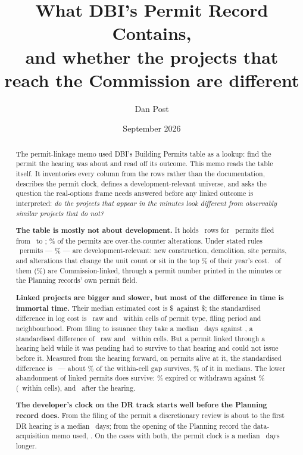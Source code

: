 \documentclass[11pt]{article}
\title{What DBI's Permit Record Contains,\\
\large and whether the projects that reach the Commission are different}
\author{Dan Post}
\date{September 2026}
\begin{document}
\maketitle

\begin{abstract}
\noindent
The permit-linkage memo used DBI's Building Permits table as a lookup: find the permit the
hearing was about and read off its outcome. This memo reads the table itself. It inventories
every column from the rows rather than the documentation, describes the permit clock, defines
a development-relevant universe, and asks the question the real-options frame needs answered
before any linked outcome is interpreted: \emph{do the projects that appear in the minutes
look different from observably similar projects that do not?}

\medskip\noindent
\textbf{The table is mostly not about development.} It holds \pcRows\ rows for \pcPermits\
permits filed from \pcFiledFirst\ to \pcFiledLast; \pcOTCShare\% of the permits are
over-the-counter alterations. Under stated rules \pcUniverse\ permits --- \pcUniverseShare\%
--- are development-relevant: new construction, demolition, site permits, and alterations that
change the unit count or sit in the top \pcCostQ\% of their year's cost. \pcLinked\ of them
(\pcLinkedShare\%) are Commission-linked, through a permit number printed in the minutes or the
Planning records' own permit field.

\medskip\noindent
\textbf{Linked projects are bigger and slower, but most of the difference in time is
immortal time.} Their median estimated cost is \$\pcLinkedCostMed\ against
\$\pcUnlinkedCostMed; the standardised difference in log cost is \pcSdLogCostRaw\ raw and
\pcSdLogCostCell\ within cells of permit type, filing period and neighbourhood. From filing to
issuance they take a median \pcLinkedDays\ days against \pcUnlinkedDays, a standardised
difference of \pcSdDaysRaw\ raw and \pcSdDaysCell\ within cells. But a permit linked through a
hearing held while it was pending had to survive to that hearing and could not issue before
it. Measured from the hearing forward, on permits alive at it, the standardised difference is
\pcLmSdDays\ --- about \pcLmSurviveDays\% of the within-cell gap survives, \pcLmMedSurvive\% of
it in medians. The lower abandonment of
linked permits does survive: \pcLinkedExit\% expired or withdrawn against \pcUnlinkedExit\%
(\pcSdExitCell\ within cells), and \pcLmSdExit\ after the hearing.

\medskip\noindent
\textbf{The developer's clock on the DR track starts well before the Planning record does.}
From the filing of the permit a discretionary review is about to the first DR hearing is a
median \pcDrDbiMed\ days; from the opening of the Planning record the data-acquisition memo
used, \pcDrRecMed. On the cases with both, the permit clock is a median \pcDrDiffMed\ days
longer.
\end{abstract}
\end{document}
